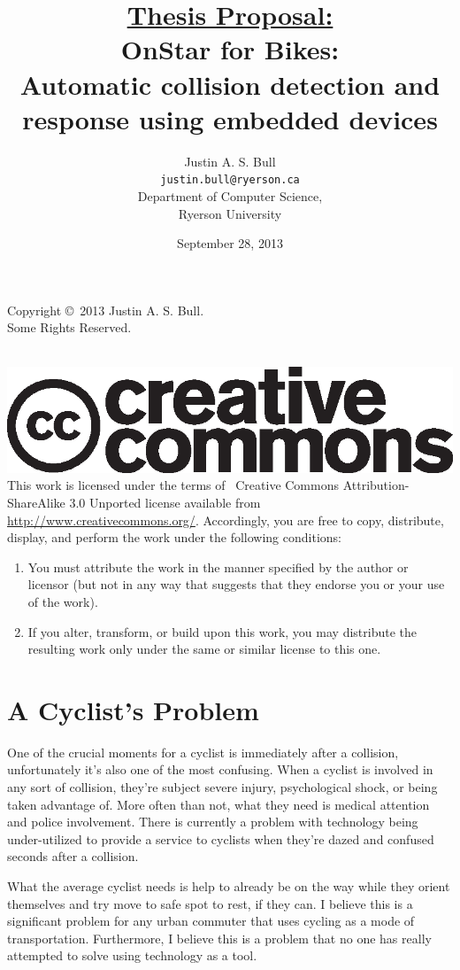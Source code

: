 \documentclass[titlepage]{article}
\title{\underline{Thesis Proposal:}\\
	\vspace{12pt}
	OnStar for Bikes:\\
	Automatic collision detection and response using embedded devices}
\author{Justin A. S. Bull\\
	\texttt{justin.bull@ryerson.ca}\\
	Department of Computer Science,\\
	Ryerson University\\}
\date{September 28, 2013\\
	\vspace{36pt}
	{\Huge \ccbysa}}
\begin{document}
\maketitle

\null
\vfill
\noindent
{\small
Copyright \copyright\ 2013 Justin A. S. Bull.\\
Some Rights Reserved.

\noindent
\\
\includegraphics*[scale=0.4]{cclogo.eps}
\\

\noindent
This work is licensed under the terms of \ccbysa\ Creative Commons
Attribution-ShareAlike 3.0 Unported license available from
\url{http://www.creativecommons.org/}. Accordingly, you are free to copy, distribute,
display, and perform the work under the following conditions:
\begin{enumerate}
	\item {\large \ccAttribution} You must attribute the work in the manner specified by the author or licensor (but not in any way that suggests that they endorse you or your use of the work).
	\item {\large \ccShareAlike} If you alter, transform, or build upon this work, you may distribute the resulting work only under the same or similar license to this one.
\end{enumerate}
}

\clearpage

\section{A Cyclist's Problem}
One of the crucial moments for a cyclist is immediately after a collision, unfortunately it's also one of the most confusing. When a cyclist is involved in any sort of collision, they're subject severe injury, psychological shock, or being taken advantage of. More often than not, what they need is medical attention and police involvement. There is currently a problem with technology being under-utilized to provide a service to cyclists when they're dazed and confused seconds after a collision.

What the average cyclist needs is help to already be on the way while they orient themselves and try move to safe spot to rest, if they can. I believe this is a significant problem for any urban commuter that uses cycling as a mode of transportation. Furthermore, I believe this is a problem that no one has really attempted to solve using technology as a tool.
\end{document}
